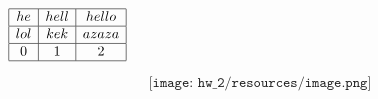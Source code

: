 \documentclass[12pt]{article}
\begin{document}
$
\begin{array}{|c|c|c|}
\hline
he & hell & hello\\
\hline
lol & kek & azaza\\
\hline
0 & 1 & 2\\
\hline
\end{array}
$

$$\texttt{[image: hw\_2/resources/image.png]}$$
\end{document}

